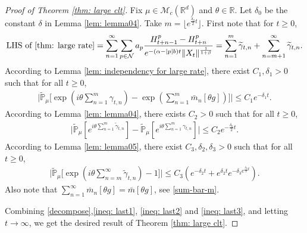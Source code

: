 \documentclass[12pt,a4paper]{amsart}
\theoremstyle{plain}
\theoremstyle{definition}
\numberwithin{equation}{section}
\begin{document}
\begin{proof}[Proof of Theorem \ref{thm: large clt}]
  Fix $\mu \in \mathcal M_c(\mathbb R^d)$ and $\theta \in \mathbb R$.
  Let $\delta_0$ be the constant $\delta$ in Lemma \ref{lem: lemma04}.
  Take $m=\lfloor e^{\frac{\delta_0}{2}t}\rfloor$.
  First note that for $t\ge 0$,
  \begin{align}\label{decompose}
    \text{LHS of \eqref{thm: large rate}}
    =\sum_{n=1}^{\infty}\sum_{p\in \mathcal{N}}a_p\frac{H^p_{t+n-1}-H^p_{t+n}}{e^{-(\alpha-|p|b)t}\|X_t\|^{\frac{1}{1+\beta}}}=\sum_{n=1}^m\widetilde{\gamma}_{t,n}+\sum_{n=m+1}^{\infty}\widetilde{\gamma}_{t,n}.
  \end{align}
  According to Lemma \ref{lem: independency for large rate}, there exist $C_1,\delta_1>0$ such that for all $t\geq 0$,
  \begin{align}
    \label{ineq: last1}
    \Big| \widetilde{ \mathbb{ P } }_{ \mu } \Big[ \exp( i \theta \sum_{ n = 1 }^m \gamma_{ t, n} ) - \exp( \sum_{ n = 1 }^m \bar{ m }_n [ \theta g ] ) \Big]
    \Big|\leq C_1 e^{-\delta_1 t}.
  \end{align}
  According to Lemma \ref{lem: lemma04}, there exists $C_2>0$ such that for all $t\geq 0$,
  \begin{align}
    \label{ineq: last2}
    \Big|\widetilde{\mathbb{P}}_{\mu}[e^{i\theta\sum_{n=1}^m \widetilde{\gamma}_{t,n}}]-\widetilde{\mathbb{P}}_{\mu}[e^{i\theta \sum_{n=1}^m\gamma_{t,n}}]\Big|\leq C_2  e^{-\frac{\delta_0}{2} t}.
  \end{align}
  According to Lemma \ref{lem: lemma05}, there exist $C_3,\delta_2,\delta_3>0$ such that for all $t\geq 0$,
  \begin{align}
    \label{ineq: last3}
    \Big|\widetilde{\mathbb{P}}_{\mu}\Big[\exp(i\theta \sum_{n=m}^{\infty}\widetilde{\gamma}_{t,n})-1\Big]\Big|\leq C_3(e^{-\delta_2 t}+e^{\delta_2 t}e^{-\delta_3 e^{\frac{\delta_0}{2}t}}).
  \end{align}
  Also note that $\sum_{n=1}^\infty\bar{m}_n[\theta g]=\bar{m}[\theta g]$, see \eqref{sum-bar-m}.

  Combining \eqref{decompose},\eqref{ineq: last1}, \eqref{ineq: last2} and \eqref{ineq: last3}, and letting $t\to\infty$, we get the desired result of Theorem \ref{thm: large clt}.
\end{proof}

\appendix
\section{ }
\end{document}
